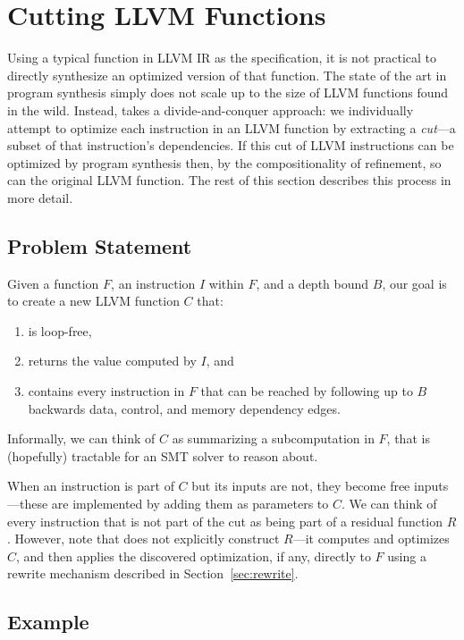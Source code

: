 \section{Cutting LLVM Functions}
\label{sec:cut}

Using a typical function in LLVM IR as the specification, it is not
practical to directly synthesize an optimized version of that
function.
%
The state of the art in program synthesis simply does not scale up to
the size of LLVM functions found in the wild.
%
Instead, \minotaur{} takes a divide-and-conquer approach: we individually
attempt to optimize each instruction in an LLVM function by extracting
a \textit{cut}---a subset of that instruction's dependencies.
%
If this cut of LLVM instructions can be optimized by program synthesis
then, by the compositionality of refinement, so can the original LLVM
function.
%
The rest of this section describes this process in more detail.


\subsection{Problem Statement}

Given a function $F$, an instruction $I$ within $F$, and a depth
bound $B$, our goal is to create a new LLVM function $C$ that:
%
\begin{enumerate}
\item
  is loop-free,
\item
  returns the value computed by $I$, and
\item
  contains every instruction in $F$ that can be reached by following
  up to $B$ backwards data, control, and memory dependency edges.
\end{enumerate}
%
Informally, we can think of $C$ as summarizing a subcomputation in
$F$, that is (hopefully) tractable for an SMT solver to reason about.


When an instruction is part of $C$ but its inputs are not, they
become free inputs---these are implemented by adding them as
parameters to $C$.
%
We can think of every instruction that is not part of the cut as being
part of a residual function $R$.
%
However, note that \minotaur{} does not explicitly construct $R$---it
computes and optimizes $C$, and then applies the discovered
optimization, if any, directly to $F$ using a rewrite mechanism
described in Section~\ref{sec:rewrite}.


\subsection{Example}


